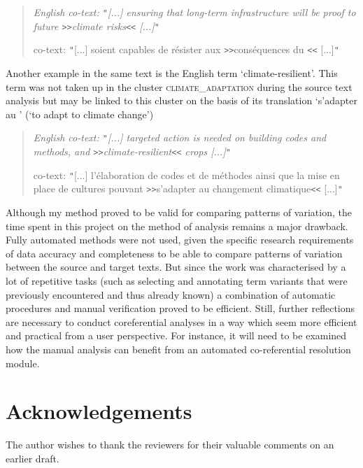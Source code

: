 \documentclass[output=paper]{langsci/langscibook.cls}
\begin{document}
\begin{quote}
\textit{English co-text: \texttt{"}[...] ensuring that long-term infrastructure 
will be proof to future \texttt{>}\texttt{>}climate risks\texttt{<}\texttt{<} [...]\texttt{"}}

 co-text: \texttt{"}[...] soient capables de résister aux \texttt{>}\texttt{>}conséquences 
du \texttt{<}\texttt{<} [...]\texttt{"}
\end{quote}

Another example in the same text is the English term `climate-resilient'. This 
term was not taken up in the cluster \textsc{climate\_adaptation} during the source 
text analysis but may be linked to this cluster on the basis of its  translation 
`s'adapter au ' (`to adapt to climate change')

\begin{quote}
\textit{English co-text: \texttt{"}[...] targeted action is needed on building 
codes and methods, and \texttt{>}\texttt{>}climate-resilient\texttt{<}\texttt{<} 
crops [...]\texttt{"}}

 co-text: \texttt{"}[...] l'élaboration de codes et de méthodes ainsi que 
la mise en place de cultures pouvant \texttt{>}\texttt{>}s'adapter au changement 
climatique\texttt{<}\texttt{<} [...]\texttt{"}
\end{quote}


Although my method proved to be valid for comparing patterns of variation, the 
time spent in this project on the method of analysis remains a major drawback. 
Fully automated  methods were not used, given the specific research requirements 
of data accuracy and completeness to be able to compare patterns of variation between 
the source and target texts. But since the work was characterised by a lot of repetitive 
tasks (such as selecting and annotating term variants that were previously encountered 
and thus already known) a combination of automatic procedures and manual verification 
proved to be efficient. Still, further reflections are necessary to conduct coreferential 
analyses in a way which seem more efficient and practical from a user perspective. 
For instance, it will need to be examined how the manual analysis can benefit from 
an automated co-referential resolution module.

\section*{Acknowledgements}

The author wishes to thank the reviewers for their valuable comments on an earlier 
draft.
{\sloppy
\printbibliography[heading=subbibliography,notkeyword=this] 
}
\end{document}
